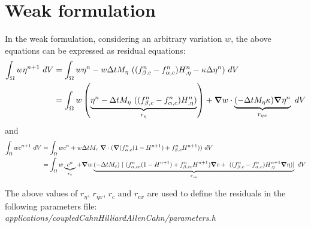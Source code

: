 \documentclass[10pt]{article}
\newcommand{\gv}[1]{\ensuremath{\mbox{\boldmath$ #1 $}}}
\newcommand{\grad}[1]{\gv{\nabla} #1}
\begin{document}
\section{Weak formulation}
In the weak formulation, considering an arbitrary variation $w$, the above equations can be expressed as residual equations:
\begin{align}
  \int_{\Omega}   w  \eta^{n+1}  ~dV &= \int_{\Omega}   w \eta^{n} -   w    \Delta t M_{\eta}~ ((f_{\beta,c}^n-f_{\alpha,c}^n)H_{,\eta}^n - \kappa \Delta \eta^n)  ~dV\\
  &=\int_{\Omega}  w  \left( \underbrace{\eta^{n} - \Delta t M_{\eta}~ ((f_{\beta,c}^n-f_{\alpha,c}^n)H_{,\eta}^n)}_{r_{\eta}} \right)+ \grad w \cdot \underbrace{(- \Delta t M_{\eta}\kappa) \grad \eta^{n}}_{r_{\eta x}} ~dV 
\end{align}
and 
\begin{align}
  \int_{\Omega}   w  c^{n+1}  ~dV &= \int_{\Omega}   w c^{n} + w    \Delta t M_{c}~ \grad \cdot (\grad (f_{\alpha,c}^n(1-H^{n+1})+f_{\beta,c}^n H^{n+1}))  ~dV\\
    &= \int_{\Omega}   w \underbrace{c^{n}}_{r_c} +  \grad w   \underbrace{(-\Delta t M_{c})~ [~(f_{\alpha,cc}^n(1-H^{n+1})+f_{\beta,cc}^n H^{n+1}) \grad c + ~((f_{\beta,c}^n-f_{\alpha,c}^n)H^{n+1}_{,\eta} \grad \eta) ] }_{r_{cx}} ~dV
\end{align}

\vskip 0.25in
The above values of $r_{\eta}$, $r_{\eta x}$, $r_{c}$ and $r_{cx}$ are used to define the residuals in the following parameters file: \\
\textit{applications/coupledCahnHilliardAllenCahn/parameters.h}
\end{document}
